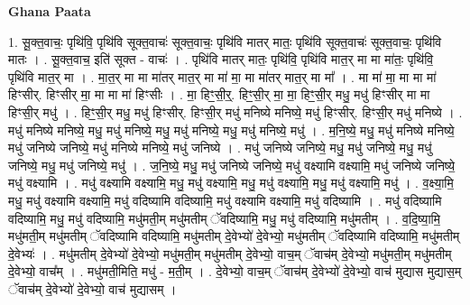 \documentclass[17pt]{extarticle}
\begin{document}
\textbf{Ghana Paata } \newline

1. सू॒क्त॒वाचः॒ पृथि॑वि॒ पृथि॑वि सूक्त॒वाचः॑ सूक्त॒वाचः॒ पृथि॑वि मातर् मातः॒ पृथि॑वि सूक्त॒वाचः॑ सूक्त॒वाचः॒ पृथि॑वि मातः । . सू॒क्त॒वाच॒ इति॑ सूक्त - वाचः॑ । . पृथि॑वि मातर् मातः॒ पृथि॑वि॒ पृथि॑वि मात॒र् मा मा मा॑तः॒ पृथि॑वि॒ पृथि॑वि मात॒र् मा । . मा॒त॒र् मा मा मा॑तर् मात॒र् मा मा॑ मा॒ मा मा॑तर् मात॒र् मा मा᳚ । . मा मा॑ मा॒ मा मा मा॑ हिꣳसीर्. हिꣳसीर् मा॒ मा मा मा॑ हिꣳसीः । . मा॒ हिꣳ॒॒सी॒र्॒. हिꣳ॒॒सी॒र् मा॒ मा॒ हिꣳ॒॒सी॒र् मधु॒ मधु॑ हिꣳसीर् मा मा हिꣳसी॒र् मधु॑ । . हिꣳ॒॒सी॒र् मधु॒ मधु॑ हिꣳसीर्. हिꣳसी॒र् मधु॑ मनिष्ये मनिष्ये॒ मधु॑ हिꣳसीर्. हिꣳसी॒र् मधु॑ मनिष्ये । . मधु॑ मनिष्ये मनिष्ये॒ मधु॒ मधु॑ मनिष्ये॒ मधु॒ मधु॑ मनिष्ये॒ मधु॒ मधु॑ मनिष्ये॒ मधु॑ । . म॒नि॒ष्ये॒ मधु॒ मधु॑ मनिष्ये मनिष्ये॒ मधु॑ जनिष्ये जनिष्ये॒ मधु॑ मनिष्ये मनिष्ये॒ मधु॑ जनिष्ये । . मधु॑ जनिष्ये जनिष्ये॒ मधु॒ मधु॑ जनिष्ये॒ मधु॒ मधु॑ जनिष्ये॒ मधु॒ मधु॑ जनिष्ये॒ मधु॑ । . ज॒नि॒ष्ये॒ मधु॒ मधु॑ जनिष्ये जनिष्ये॒ मधु॑ वक्ष्यामि वक्ष्यामि॒ मधु॑ जनिष्ये जनिष्ये॒ मधु॑ वक्ष्यामि । . मधु॑ वक्ष्यामि वक्ष्यामि॒ मधु॒ मधु॑ वक्ष्यामि॒ मधु॒ मधु॑ वक्ष्यामि॒ मधु॒ मधु॑ वक्ष्यामि॒ मधु॑ । . व॒क्ष्या॒मि॒ मधु॒ मधु॑ वक्ष्यामि वक्ष्यामि॒ मधु॑ वदिष्यामि वदिष्यामि॒ मधु॑ वक्ष्यामि वक्ष्यामि॒ मधु॑ वदिष्यामि । . मधु॑ वदिष्यामि वदिष्यामि॒ मधु॒ मधु॑ वदिष्यामि॒ मधु॑मती॒म् मधु॑मतीम् ॅवदिष्यामि॒ मधु॒ मधु॑ वदिष्यामि॒ मधु॑मतीम् । . व॒दि॒ष्या॒मि॒ मधु॑मती॒म् मधु॑मतीम् ॅवदिष्यामि वदिष्यामि॒ मधु॑मतीम् दे॒वेभ्यो॑ दे॒वेभ्यो॒ मधु॑मतीम् ॅवदिष्यामि वदिष्यामि॒ मधु॑मतीम् दे॒वेभ्यः॑ । . मधु॑मतीम् दे॒वेभ्यो॑ दे॒वेभ्यो॒ मधु॑मती॒म् मधु॑मतीम् दे॒वेभ्यो॒ वाच॒म् ॅवाच॑म् दे॒वेभ्यो॒ मधु॑मती॒म् मधु॑मतीम् दे॒वेभ्यो॒ वाच᳚म् । . मधु॑मती॒मिति॒ मधु॑ - म॒ती॒म् । . दे॒वेभ्यो॒ वाच॒म् ॅवाच॑म् दे॒वेभ्यो॑ दे॒वेभ्यो॒ वाच॑ मुद्यास मुद्यास॒म् ॅवाच॑म् दे॒वेभ्यो॑ दे॒वेभ्यो॒ वाच॑ मुद्यासम् । \newline
\end{document}
